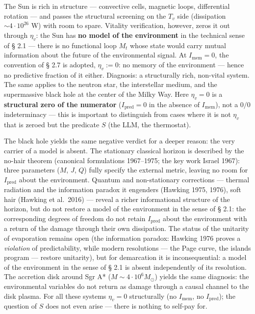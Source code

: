 \documentclass[pdflatex,sn-mathphys-ay]{sn-jnl}
\begin{document}
The Sun is rich in structure --- convective cells, magnetic loops, differential rotation --- and passes the structural screening on the \(T_v\) side (dissipation \(\sim 4 \cdot 10^{26}\) W) with room to spare. Vitality verification, however, zeros it out through \(\eta_v\): the Sun has \textbf{no model of the environment} in the technical sense of § 2.1 --- there is no functional loop \(M_t\) whose state would carry mutual information about the future of the environmental signal. At \(I_{\text{mem}} = 0\), the convention of § 2.7 is adopted, \(\eta_v := 0\): no memory of the environment --- hence no predictive fraction of it either. Diagnosis: a structurally rich, non-vital system. The same applies to the neutron star, the interstellar medium, and the supermassive black hole at the center of the Milky Way. Here \(\eta_v = 0\) is a \textbf{structural zero of the numerator} (\(I_{\text{pred}} = 0\) in the absence of \(I_{\text{mem}}\)), not a \(0/0\) indeterminacy --- this is important to distinguish from cases where it is not \(\eta_v\) that is zeroed but the predicate \(S\) (the LLM, the thermostat).

The black hole yields the same negative verdict for a deeper reason: the very carrier of a model is absent. The stationary classical horizon is described by the no-hair theorem (canonical formulations 1967--1975; the key work Israel 1967): three parameters (\(M\), \(J\), \(Q\)) fully specify the external metric, leaving no room for \(I_{\text{pred}}\) about the environment. Quantum and non-stationary corrections --- thermal radiation and the information paradox it engenders (Hawking 1975, 1976), soft hair (Hawking et al.~2016) --- reveal a richer informational structure of the horizon, but do not restore a model of the environment in the sense of § 2.1: the corresponding degrees of freedom do not retain \(I_{\text{pred}}\) about the environment with a return of the damage through their own dissipation. The status of the unitarity of evaporation remains open (the information paradox: Hawking 1976 proves a \emph{violation} of predictability, while modern resolutions --- the Page curve, the islands program --- restore unitarity), but for demarcation it is inconsequential: a model of the environment in the sense of § 2.1 is absent independently of its resolution. The accretion disk around Sgr A* (\(M \sim 4 \cdot 10^6 M_\odot\)) yields the same diagnosis: the environmental variables do not return as damage through a causal channel to the disk plasma. For all these systems \(\eta_v = 0\) structurally (no \(I_{\text{mem}}\), no \(I_{\text{pred}}\)); the question of \(S\) does not even arise --- there is nothing to self-pay for.
\end{document}
